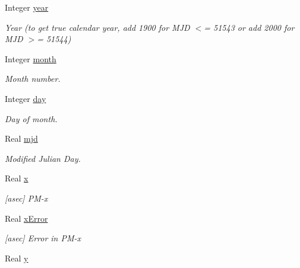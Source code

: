 \begin{DoxyCompactItemize}
\item 
Integer \hyperlink{structostk_1_1physics_1_1coord_1_1frame_1_1provider_1_1iers_1_1_bulletin_a_1_1_observation_a3142688fc8e50f2f3e608bc9b1768389}{year}
\begin{DoxyCompactList}\small\item\em Year (to get true calendar year, add 1900 for M\+JD $<$= 51543 or add 2000 for M\+JD $>$= 51544) \end{DoxyCompactList}\item 
Integer \hyperlink{structostk_1_1physics_1_1coord_1_1frame_1_1provider_1_1iers_1_1_bulletin_a_1_1_observation_ad9b545f974be7c189ec315b75fd83670}{month}
\begin{DoxyCompactList}\small\item\em Month number. \end{DoxyCompactList}\item 
Integer \hyperlink{structostk_1_1physics_1_1coord_1_1frame_1_1provider_1_1iers_1_1_bulletin_a_1_1_observation_a4bb1b8697d74b570e4fd133eacbe6d08}{day}
\begin{DoxyCompactList}\small\item\em Day of month. \end{DoxyCompactList}\item 
Real \hyperlink{structostk_1_1physics_1_1coord_1_1frame_1_1provider_1_1iers_1_1_bulletin_a_1_1_observation_ab2d4ba5a0e3d43c9dddde944d445e547}{mjd}
\begin{DoxyCompactList}\small\item\em Modified Julian Day. \end{DoxyCompactList}\item 
Real \hyperlink{structostk_1_1physics_1_1coord_1_1frame_1_1provider_1_1iers_1_1_bulletin_a_1_1_observation_a7aea0e414b8fe2222d2834f5f7a383e8}{x}
\begin{DoxyCompactList}\small\item\em \mbox{[}asec\mbox{]} P\+M-\/x \end{DoxyCompactList}\item 
Real \hyperlink{structostk_1_1physics_1_1coord_1_1frame_1_1provider_1_1iers_1_1_bulletin_a_1_1_observation_ab685813c764d18d22d454cb4015167c0}{x\+Error}
\begin{DoxyCompactList}\small\item\em \mbox{[}asec\mbox{]} Error in P\+M-\/x \end{DoxyCompactList}\item 
Real \hyperlink{structostk_1_1physics_1_1coord_1_1frame_1_1provider_1_1iers_1_1_bulletin_a_1_1_observation_a611d7e822bedfbf486517da90cdd5f21}{y}

\end{DoxyCompactItemize}
